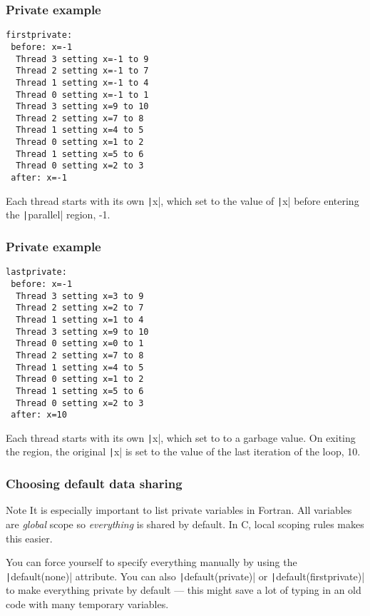 \documentclass{beamer}
\begin{document}
\begin{frame}[fragile]
\frametitle{Private example}
\begin{verbatim}
firstprivate:
 before: x=-1
  Thread 3 setting x=-1 to 9
  Thread 2 setting x=-1 to 7
  Thread 1 setting x=-1 to 4
  Thread 0 setting x=-1 to 1
  Thread 3 setting x=9 to 10
  Thread 2 setting x=7 to 8
  Thread 1 setting x=4 to 5
  Thread 0 setting x=1 to 2
  Thread 1 setting x=5 to 6
  Thread 0 setting x=2 to 3
 after: x=-1
\end{verbatim}
Each thread starts with its own \texttt|x|, which set to the value of \texttt|x| before entering the \texttt|parallel| region, -1.
\end{frame}

\begin{frame}[fragile]
\frametitle{Private example}
\begin{verbatim}
lastprivate:
 before: x=-1
  Thread 3 setting x=3 to 9
  Thread 2 setting x=2 to 7
  Thread 1 setting x=1 to 4
  Thread 3 setting x=9 to 10
  Thread 0 setting x=0 to 1
  Thread 2 setting x=7 to 8
  Thread 1 setting x=4 to 5
  Thread 0 setting x=1 to 2
  Thread 1 setting x=5 to 6
  Thread 0 setting x=2 to 3
 after: x=10
\end{verbatim}
Each thread starts with its own \texttt|x|, which set to to a garbage value.
On exiting the region, the original \texttt|x| is set to the value of the last iteration of the loop, 10.
\end{frame}

\begin{frame}
\frametitle{Choosing default data sharing}
\begin{alertblock}{Note}
It is especially important to list private variables in Fortran.
All variables are \emph{global} scope so \emph{everything} is shared by default.
In C, local scoping rules makes this easier.
\end{alertblock}

You can force yourself to specify everything manually by using the \texttt|default(none)| attribute.
You can also \texttt|default(private)| or \texttt|default(firstprivate)| to make everything private by default --- this might save a lot of typing in an old code with many temporary variables.

\end{frame}
\end{document}
